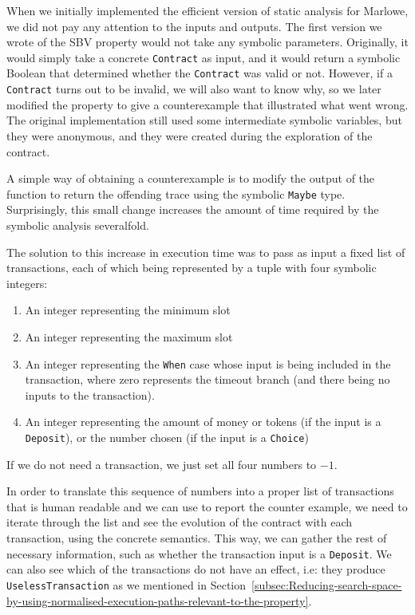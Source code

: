 \documentclass[english,runningheads]{llncs}
\begin{document}
When we initially implemented the efficient version of static analysis
for Marlowe, we did not pay any attention to the inputs and outputs.
The first version we wrote of the SBV property would not take any
symbolic parameters. Originally, it would simply take a concrete \texttt{Contract}
as input, and it would return a symbolic Boolean that determined whether
the \texttt{Contract} was valid or not. However, if a \texttt{Contract}
turns out to be invalid, we will also want to know why, so we later modified
the property to give a counterexample that illustrated what went wrong.
The original implementation still used some intermediate symbolic
variables, but they were anonymous, and they were created during the
exploration of the contract.

A simple way of obtaining a counterexample is to modify the output
of the function to return the offending trace using the symbolic \texttt{Maybe}
type. Surprisingly, this small change increases the amount of time
required by the symbolic analysis severalfold.

The solution to this increase in execution time was to pass as input
a fixed list of transactions, each of which being represented by a
tuple with four symbolic integers:
\begin{enumerate}
\item An integer representing the minimum slot
\item An integer representing the maximum slot
\item An integer representing the \texttt{When} case whose input is being
included in the transaction, where zero represents the timeout branch
(and there being no inputs to the transaction).
\item An integer representing the amount of money or tokens (if the input
is a \texttt{Deposit}), or the number chosen (if the input is a \texttt{Choice})
\end{enumerate}
If we do not need a transaction, we just set all four numbers to $-1$.

In order to translate this sequence of numbers into a proper list
of transactions that is human readable and we can use to report the
counter example, we need to iterate through the list and see the evolution
of the contract with each transaction, using the concrete semantics.
This way, we can gather the rest of necessary information, such as
whether the transaction input is a \texttt{Deposit}. We can also see
which of the transactions do not have an effect, i.e: they produce
\texttt{UselessTransaction} as we mentioned in Section~\ref{subsec:Reducing-search-space-by-using-normalised-execution-paths-relevant-to-the-property}.
\end{document}
